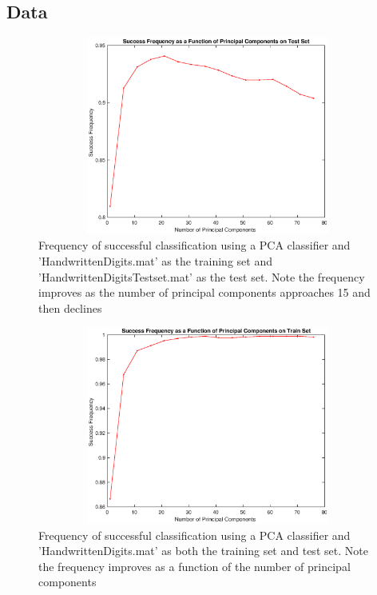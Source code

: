 \documentclass{article}
\begin{document}
\subsection*{Data}
\begin{figure}[H]
    \centerline
    {
    \includegraphics[width=15cm, height=6.5cm]{Q1_test}
    }
    \caption{\label{fig:my figure} Frequency of successful classification using a PCA classifier and 'HandwrittenDigits.mat' as the training set and 'HandwrittenDigitsTestset.mat' as the test set.  Note the frequency improves as the number of principal components approaches 15 and then declines}
\end{figure}

\begin{figure}[H]
    \centerline
    {
    \includegraphics[width=15cm, height=6.5cm]{Q1_train}
    }
    \caption{\label{fig:my figure} Frequency of successful classification using a PCA classifier and 'HandwrittenDigits.mat' as both the training set and test set.  Note the frequency improves as a function of the number of principal components }
\end{figure}
\end{document}
